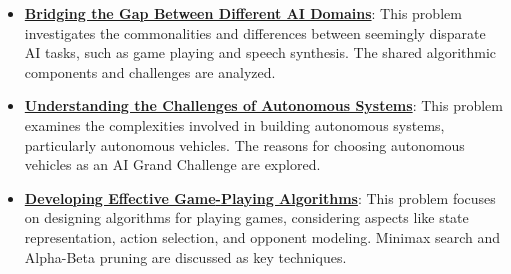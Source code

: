 \documentclass{article}%
\begin{document}
\begin{itemize}[leftmargin=*]
\item \href{https://purdue.brightspace.com/d2l/common/assets/pdfjs-d2l-dist/1.0.14-legacy/web/viewer.html?file=\%2Fcontent\%2Fenforced\%2F1095467-wl.202510.CS.24300.001\%2F02L2-Intro.pdf\%3Fou\%3D1095467\&lang=en-us\&container=d2l-fileviewer-rendered-pdf\&fullscreen=d2l-fileviewer-rendered-pdf-dialog\&height=667#page=31}{\textbf{Bridging the Gap Between Different AI Domains}}: This problem investigates the commonalities and differences between seemingly disparate AI tasks, such as game playing and speech synthesis. The shared algorithmic components and challenges are analyzed.%
\item \href{https://purdue.brightspace.com/d2l/common/assets/pdfjs-d2l-dist/1.0.14-legacy/web/viewer.html?file=\%2Fcontent\%2Fenforced\%2F1095467-wl.202510.CS.24300.001\%2F02L2-Intro.pdf\%3Fou\%3D1095467\&lang=en-us\&container=d2l-fileviewer-rendered-pdf\&fullscreen=d2l-fileviewer-rendered-pdf-dialog\&height=667#page=43}{\textbf{Understanding the Challenges of Autonomous Systems}}: This problem examines the complexities involved in building autonomous systems, particularly autonomous vehicles. The reasons for choosing autonomous vehicles as an AI Grand Challenge are explored.%
\item \href{https://purdue.brightspace.com/d2l/common/assets/pdfjs-d2l-dist/1.0.14-legacy/web/viewer.html?file=\%2Fcontent\%2Fenforced\%2F1095467-wl.202510.CS.24300.001\%2F02L2-Intro.pdf\%3Fou\%3D1095467\&lang=en-us\&container=d2l-fileviewer-rendered-pdf\&fullscreen=d2l-fileviewer-rendered-pdf-dialog\&height=667#page=22}{\textbf{Developing Effective Game{-}Playing Algorithms}}: This problem focuses on designing algorithms for playing games, considering aspects like state representation, action selection, and opponent modeling. Minimax search and Alpha{-}Beta pruning are discussed as key techniques.%
\end{itemize}

%
\end{document}
